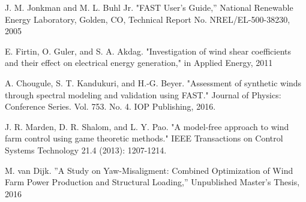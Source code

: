 \begin{thebibliography}{99}
J. M. Jonkman and M. L. Buhl Jr. "FAST User's Guide,'' National Renewable Energy Laboratory, Golden, CO, Technical Report No. NREL/EL-500-38230, 2005

E. Firtin, O. Guler, and S. A. Akdag. "Investigation of wind shear coefficients and their effect on electrical energy generation," in Applied Energy, 2011

A. Chougule, S. T. Kandukuri, and H.-G. Beyer. "Assessment of synthetic winds through spectral modeling and validation using FAST." Journal of Physics: Conference Series. Vol. 753. No. 4. IOP Publishing, 2016.

J. R. Marden, D. R. Shalom, and L. Y. Pao. "A model-free approach to wind farm control using game theoretic methods." IEEE Transactions on Control Systems Technology 21.4 (2013): 1207-1214.	


M. van Dijk. ''A Study on Yaw-Misaligment: Combined Optimization of Wind Farm Power Production and Structural Loading,'' Unpublished Master's Thesis, 2016











\end{thebibliography}